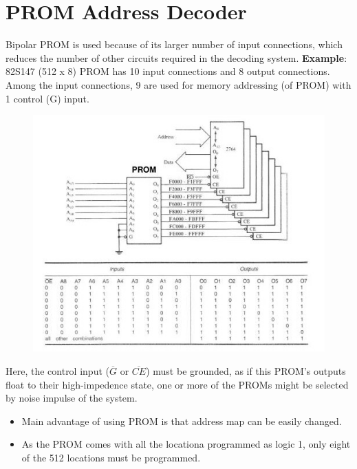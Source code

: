\section{PROM Address Decoder}
Bipolar PROM is used because of its larger number of input connections, which reduces the number of other circuits required in the decoding system.\newline
\textbf{Example}: 82S147 (512 x 8) PROM has 10 input connections and 8 output connections. Among the input connections, 9 are used for memory addressing (of PROM) with 1 control (G) input. \newline
\begin{figure}[h!]
  \centering
  \includegraphics[width = 1.0\textwidth]{./figures/PROM.jpg}
\end{figure}
Here, the control input ($\overline{G}$ or $\overline{CE}$) must be grounded, as if this PROM's outputs float to their high-impedence state, one or more of the PROMs might be selected by noise impulse of the system.
\begin{itemize}
  \item Main advantage of using PROM is that address map can be easily changed.
  \item As the PROM comes with all the locationa programmed as logic 1, only eight of the 512 locations must be programmed.
\end{itemize}

